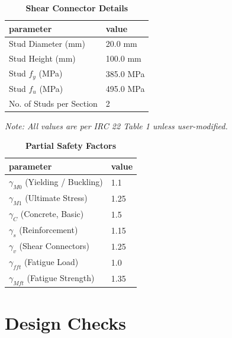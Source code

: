 \documentclass[12pt,a4paper]{report}
\numberwithin{table}{chapter}
\numberwithin{figure}{chapter}
\begin{document}
\label{subsec:shear-connectors}

\vspace{2.2em}

\vspace{0.4em}
\begin{longtable}{|L{5.5cm}|p{10.0cm}|}
\caption{\textbf{Shear Connector Details}}
\hline
\textbf{parameter} & \textbf{value} \\
\hline
\textnormal{Stud Diameter (mm)} & 20.0 mm \\[6pt]
\hline
\textnormal{Stud Height (mm)} & 100.0 mm \\[6pt]
\hline
\textnormal{Stud $f_y$ (MPa)} & 385.0 MPa \\[6pt]
\hline
\textnormal{Stud $f_u$ (MPa)} & 495.0 MPa \\[6pt]
\hline
\textnormal{No. of Studs per Section} & 2 \\[6pt]
\hline
\end{longtable}



\label{subsec:safety-factors}

\vspace{2.2em}

\vspace{0.3em}
\noindent\textit{Note: All values are per IRC 22 Table 1 unless user-modified.}

\vspace{0.4em}
\begin{longtable}{|L{5.5cm}|p{10.0cm}|}
\caption{\textbf{Partial Safety Factors}}
\hline
\textbf{parameter} & \textbf{value} \\
\hline
\textnormal{$\gamma_{M0}$ (Yielding / Buckling)} & 1.1 \\[6pt]
\hline
\textnormal{$\gamma_{M1}$ (Ultimate Stress)} & 1.25 \\[6pt]
\hline
\textnormal{$\gamma_C$ (Concrete, Basic)} & 1.5 \\[6pt]
\hline
\textnormal{$\gamma_s$ (Reinforcement)} & 1.15 \\[6pt]
\hline
\textnormal{$\gamma_v$ (Shear Connectors)} & 1.25 \\[6pt]
\hline
\textnormal{$\gamma_{fft}$ (Fatigue Load)} & 1.0 \\[6pt]
\hline
\textnormal{$\gamma_{Mft}$ (Fatigue Strength)} & 1.35 \\[6pt]
\hline
\end{longtable}


\chapter{Design Checks}
\end{document}
